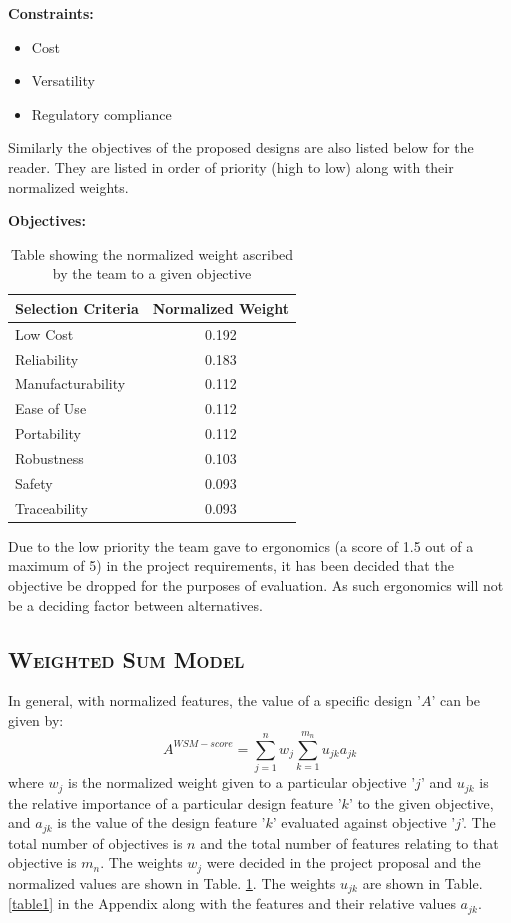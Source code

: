 \documentclass[12pt]{article}
\begin{document}
\textbf{Constraints:}
\begin{itemize}
\item Cost
\item Versatility
\item Regulatory compliance
\end{itemize}

Similarly the objectives of the proposed designs are also listed below for the reader. They are listed in order of priority (high to low) along with their normalized weights.

\textbf{Objectives:}
\begin{table}[h!]   
\begin{center}
    \begin{tabular}{ | l | c |}
    \hline
    Selection Criteria & Normalized Weight  \\ \hline
    Low Cost & 0.192    \\ \hline
    Reliability & 0.183    \\ \hline
    Manufacturability & 0.112    \\ \hline
    Ease of Use & 0.112    \\ \hline
    Portability & 0.112    \\ \hline
    Robustness & 0.103    \\ \hline
    Safety & 0.093    \\ \hline
    Traceability & 0.093    \\ \hline
	\end{tabular}
\caption{Table showing the normalized weight ascribed by the team to a given objective}
\label{norm}    
\end{center}
\end{table}

Due to the low priority the team gave to ergonomics (a score of 1.5 out of a maximum of 5) in the project requirements, it has been decided that the objective be dropped for the purposes of evaluation. As such ergonomics will not be a deciding factor between alternatives.


\subsection{\textsc{Weighted Sum Model}}
In general, with normalized features, the value of a specific design '$A$' can be given by: $$A^{WSM-score} = \sum_{j=1}^n {w_j \sum^{m_n}_{k=1} {u_{jk} a_{jk}}}$$ where $w_j$ is the normalized weight given to a particular objective '$j$' and $u_{jk}$ is the relative importance of a particular design feature '$k$' to the given objective, and $a_{jk}$ is the value of the design feature '$k$' evaluated against objective '$j$'. The total number of objectives is $n$ and the total number of features relating to that objective is $m_n$. The weights $w_j$ were decided in the project proposal and the normalized values are shown in Table. \ref{norm}. The weights $u_{jk}$ are shown in Table. \ref{table1} in the Appendix along with the features and their relative values $a_{jk}$.
\end{document}
